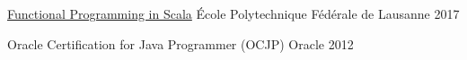 





\begin{cventries}

  \cventry
    {\href{https://www.coursera.org/account/accomplishments/specialization/9NNUCHVNV36F}{Functional Programming in Scala}}
    {\hspace{0.5em}École Polytechnique Fédérale de Lausanne} %
    {}
    {2017}
    {}
    {}
    
  \cventry
    {Oracle Certification for Java Programmer (OCJP)} %
    {\hspace{0.5em}Oracle} %
    {}
    {2012} %
    {}
    {}



\end{cventries}

